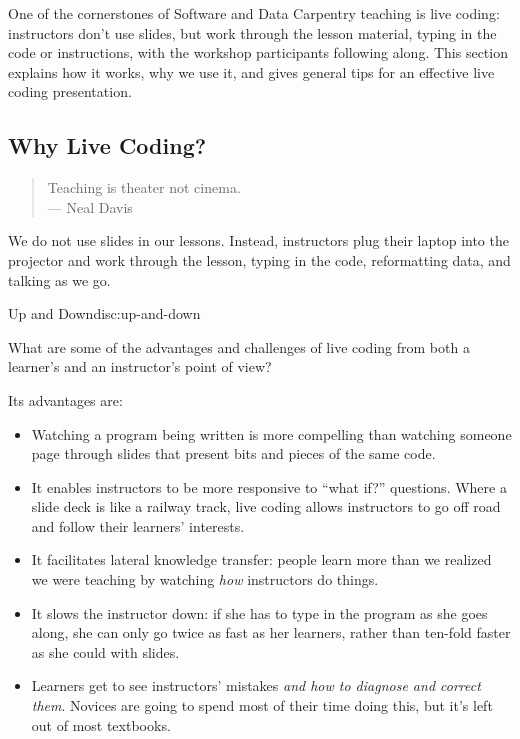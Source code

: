 
One of the cornerstones of Software and Data Carpentry teaching is live
coding: instructors don't use slides, but work through the lesson
material, typing in the code or instructions, with the workshop
participants following along. This section explains how it works, why we
use it, and gives general tips for an effective live coding
presentation.

\subsection{Why Live Coding?}\label{why-live-coding}

\begin{quote}
Teaching is theater not cinema.\\--- Neal Davis
\end{quote}

We do not use slides in our lessons. Instead, instructors plug their
laptop into the projector and work through the lesson, typing in the
code, reformatting data, and talking as we go.

\begin{discussion}{Up and Down}{disc:up-and-down}

What are some of the advantages and challenges of live coding from both
a learner's and an instructor's point of view?
\end{discussion}

Its advantages are:

\begin{itemize}
\itemsep1pt\parskip0pt
\item
  Watching a program being written is more compelling than watching
  someone page through slides that present bits and pieces of the same
  code.
\item
  It enables instructors to be more responsive to ``what if?''
  questions. Where a slide deck is like a railway track, live coding
  allows instructors to go off road and follow their learners'
  interests.
\item
  It facilitates lateral knowledge transfer: people learn more than we
  realized we were teaching by watching \emph{how} instructors do
  things.
\item
  It slows the instructor down: if she has to type in the program as she
  goes along, she can only go twice as fast as her learners, rather than
  ten-fold faster as she could with slides.
\item
  Learners get to see instructors' mistakes \emph{and how to diagnose
  and correct them}. Novices are going to spend most of their time doing
  this, but it's left out of most textbooks.
\end{itemize}

